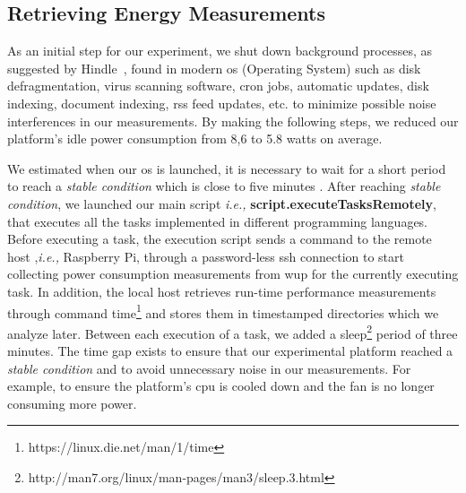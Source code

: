 \subsection{Retrieving Energy Measurements} 
As an initial step for our experiment, we shut down background 
processes, as suggested by Hindle~, 
found in modern {\sc os} (Operating System) such as disk defragmentation, virus 
scanning software, {\sc cron} jobs, automatic updates, 
disk indexing, document indexing, {\sc rss} feed updates, etc. to 
minimize possible noise interferences in our measurements. 
By making the following steps, we reduced our platform's idle 
power consumption from 8,6 to 5.8 watts on average. 


We estimated when our {\sc os} is launched, 
it is necessary to wait for a short period to reach a 
\textit{stable condition} which is close to five minutes \cite{carroll_analysis_2010}.
After reaching \textit{stable condition}, we launched our main 
script \textit{i.e.,} \textbf{script.executeTasksRemotely}, 
that executes all the tasks implemented in different programming 
languages. 
Before executing a task, the execution script sends a command 
to the remote host ,\textit{i.e.,} Raspberry Pi, through a 
password-less {\sc ssh} connection to start 
collecting power consumption measurements from {\sc wup} 
for the currently executing task. 
In addition, the local host retrieves run-time performance 
measurements through command 
time\footnote{https://linux.die.net/man/1/time} and stores them 
in timestamped directories which we analyze later.
Between each execution of a task, we added a 
sleep\footnote{http://man7.org/linux/man-pages/man3/sleep.3.html} 
period of three minutes. 
The time gap exists to ensure that our experimental platform 
reached a \textit{stable condition} and to avoid unnecessary noise 
in our measurements. 
For example, to ensure the platform's {\sc cpu} is cooled down 
and the fan is no longer consuming more power.


